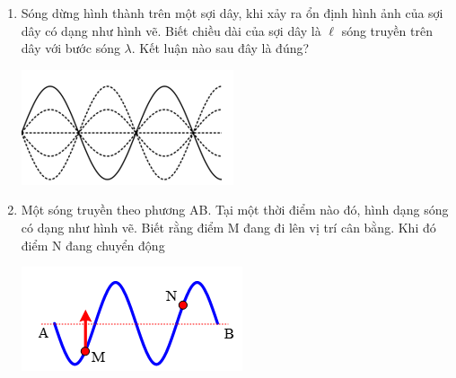 \begin{enumerate}[label=\bfseries Câu \arabic*:]
\item Sóng dừng hình thành trên một sợi dây, khi xảy ra ổn định hình ảnh của sợi dây có dạng như hình vẽ. Biết chiều dài của sợi dây là $\ell $ sóng truyền trên dây với bước sóng $\lambda.$ Kết luận nào sau đây là đúng?
\begin{center}
	\includegraphics[width=0.3\linewidth]{../figs/Y23-VN11-PH-C2-Q-1}
\end{center}

\item Một sóng truyền theo phương AB. Tại một thời điểm nào đó, hình dạng sóng có dạng như hình vẽ. Biết rằng điểm M đang đi lên vị trí cân bằng. Khi đó điểm N đang chuyển động
\begin{center}
	\includegraphics[width=0.3\linewidth]{../figs/Y23-VN11-PH-C2-Q-2}
\end{center}


\end{enumerate}
